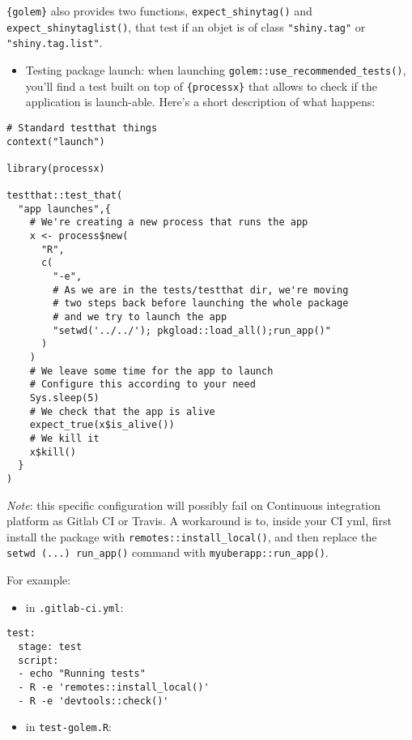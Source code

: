 \documentclass[]{book}
\providecommand{\tightlist}{%
  \setlength{\itemsep}{0pt}\setlength{\parskip}{0pt}}
\begin{document}
\texttt{\{golem\}} also provides two functions, \texttt{expect\_shinytag()} and \texttt{expect\_shinytaglist()}, that test if an objet is of class \texttt{"shiny.tag"} or \texttt{"shiny.tag.list"}.

\begin{itemize}
\tightlist
\item
  Testing package launch: when launching \texttt{golem::use\_recommended\_tests()}, you'll find a test built on top of \texttt{\{processx\}} that allows to check if the application is launch-able. Here's a short description of what happens:
\end{itemize}

\begin{verbatim}
# Standard testthat things
context("launch")

library(processx)

testthat::test_that(
  "app launches",{
    # We're creating a new process that runs the app
    x <- process$new(
      "R", 
      c(
        "-e", 
        # As we are in the tests/testthat dir, we're moving 
        # two steps back before launching the whole package
        # and we try to launch the app
        "setwd('../../'); pkgload::load_all();run_app()"
      )
    )
    # We leave some time for the app to launch
    # Configure this according to your need
    Sys.sleep(5)
    # We check that the app is alive
    expect_true(x$is_alive())
    # We kill it
    x$kill()
  }
)
\end{verbatim}

\emph{Note}: this specific configuration will possibly fail on Continuous integration platform as Gitlab CI or Travis. A workaround is to, inside your CI yml, first install the package with \texttt{remotes::install\_local()}, and then replace the \texttt{setwd\ (...)\ run\_app()} command with \texttt{myuberapp::run\_app()}.

For example:

\begin{itemize}
\tightlist
\item
  in \texttt{.gitlab-ci.yml}:
\end{itemize}

\begin{verbatim}
test:
  stage: test
  script: 
  - echo "Running tests"
  - R -e 'remotes::install_local()'
  - R -e 'devtools::check()'
\end{verbatim}

\begin{itemize}
\tightlist
\item
  in \texttt{test-golem.R}:
\end{itemize}
\end{document}
